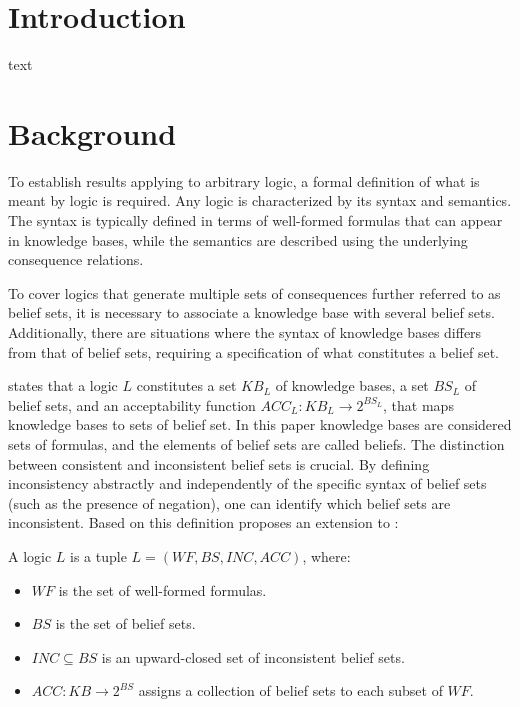 \section{Introduction}
text

\section{Background}
To establish results applying to arbitrary logic, a formal definition of what is meant by logic is required.
Any logic is characterized by its syntax and semantics.
The syntax is typically defined in terms of well-formed formulas that can appear in knowledge bases, while the semantics are described using the underlying consequence relations.

To cover logics that generate multiple sets of consequences further referred to as belief sets, it is necessary to associate a knowledge base with several belief sets.
Additionally, there are situations where the syntax of knowledge bases differs from that of belief sets, requiring a specification of what constitutes a belief set.

\cite{brewka_equilibria_2007} states that a logic \(L\) constitutes a set \(KB_L\) of knowledge bases, a set \(BS_L\) of belief sets, and an acceptability function \(ACC_L: KB_L \to 2^{BS_L}\), that maps knowledge bases to sets of belief set.
In this paper knowledge bases are considered sets of formulas, and the elements of belief sets are called beliefs.
The distinction between consistent and inconsistent belief sets is crucial.
By defining inconsistency abstractly and independently of the specific syntax of belief sets (such as the presence of negation), one can identify which belief sets are inconsistent.
Based on this definition \cite{brewka_strong_2019} proposes an extension to \cite{brewka_equilibria_2007}:

A logic \(L\) is a tuple \(L = (WF, BS, INC, ACC)\), where:
\begin{itemize}
      \item \(WF\) is the set of well-formed formulas.
      \item \(BS\) is the set of belief sets.
      \item \(INC \subseteq BS\) is an upward-closed set of inconsistent belief sets.
      \item \(ACC: KB \to 2^{BS}\) assigns a collection of belief sets to each subset of \(WF\).
\end{itemize}

